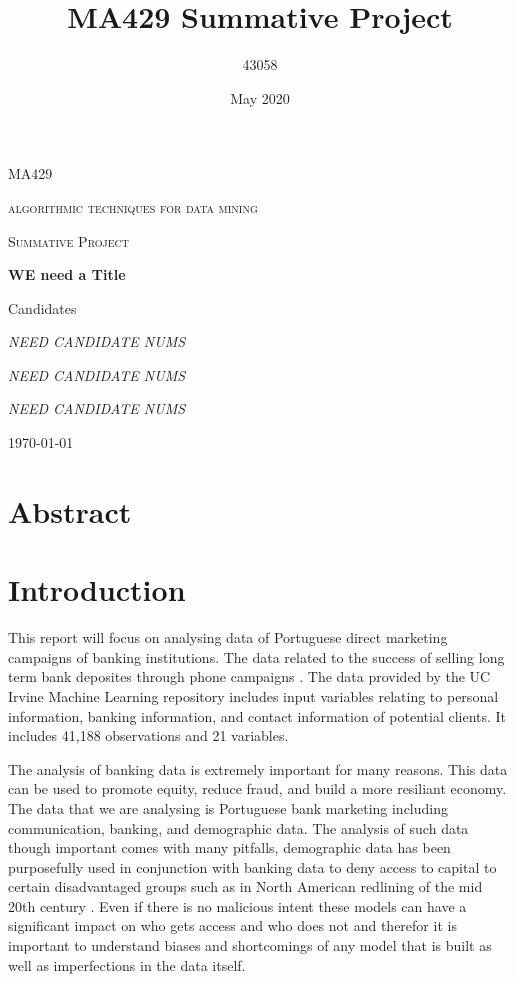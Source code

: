 \documentclass[a4paper, oneside, 11pt]{article}
\title{MA429 Summative Project}
\author{43058}
\date{May 2020}
\begin{document}
\begin{titlepage}
    \centering
    \par\vspace{1cm}
    {\scshape\LARGE MA429\par}
	{\scshape\LARGE algorithmic techniques for data mining\par}
	\vspace{1cm}
	{\scshape\Large Summative Project\par}
	\vspace{1.5cm}
	{\huge\bfseries WE need a Title\par}
    \vspace{2cm}
    {\large Candidates\par}
    {\Large\itshape NEED CANDIDATE NUMS\par}
    {\Large\itshape NEED CANDIDATE NUMS\par}
	{\Large\itshape NEED CANDIDATE NUMS\par}

	\vfill

	{\large \today\par}
\end{titlepage}
\newpage 
\tableofcontents
\newpage

\newpage 
\section*{Abstract}
\newpage

\section{Introduction}
This report will focus on analysing data of Portuguese direct marketing campaigns of banking institutions. The data related to the success of selling long term bank deposites through phone campaigns \cite{moro_data-driven_2014}. The data provided by the UC Irvine Machine Learning repository includes input variables relating to personal information, banking information, and contact information of potential clients. It includes 41,188 observations and 21 variables.

The analysis of banking data is extremely important for many reasons. This data can be used to promote equity, reduce fraud, and build a more resiliant economy. The data that we are analysing is Portuguese bank marketing including communication, banking, and demographic data. The analysis of such data though important comes with many pitfalls, demographic data has been purposefully used in conjunction with banking data to deny access to capital to certain disadvantaged groups such as in North American redlining of the mid 20th century \cite{harris_suburban_2003}. Even if there is no malicious intent these models can have a significant impact on who gets access and who does not and therefor it is important to understand biases and shortcomings of any model that is built as well as imperfections in the data itself.
\end{document}
